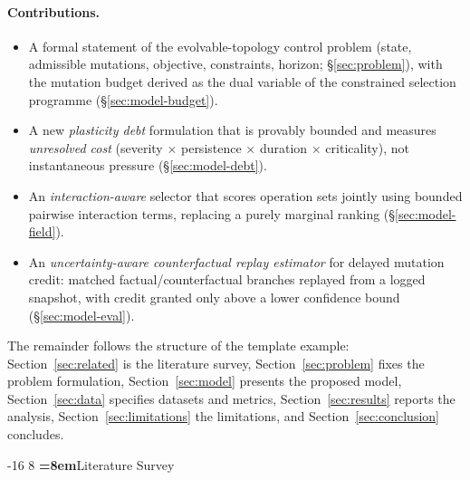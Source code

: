 \documentclass[runningheads]{llncs}
\makeatletter
\renewcommand\section{\@startsection{section}{1}{\z@}%
  {-16\p@ \@plus -4\p@ \@minus -4\p@}%
  {8\p@ \@plus 4\p@ \@minus 4\p@}%
  {\normalfont\large\bfseries\boldmath\color{vitblue}%
   \rightskip=\z@ \@plus 8em\pretolerance=10000}}
\let\plens@section\section
\renewcommand\section{\clearpage\plens@section}
\makeatother
\begin{document}
\paragraph{Contributions.}
\begin{itemize}
\item A formal statement of the evolvable-topology control problem
(state, admissible mutations, objective, constraints, horizon;
\S\ref{sec:problem}), with the mutation budget derived as the dual variable
of the constrained selection programme (\S\ref{sec:model-budget}).
\item A new \emph{plasticity debt} formulation that is provably bounded and
measures \emph{unresolved cost} (severity $\times$ persistence $\times$
duration $\times$ criticality), not instantaneous pressure
(\S\ref{sec:model-debt}).
\item An \emph{interaction-aware} selector that scores operation sets
jointly using bounded pairwise interaction terms, replacing a purely
marginal ranking (\S\ref{sec:model-field}).
\item An \emph{uncertainty-aware counterfactual replay estimator} for
delayed mutation credit: matched factual/counterfactual branches replayed
from a logged snapshot, with credit granted only above a lower confidence
bound (\S\ref{sec:model-eval}).
\end{itemize}

The remainder follows the structure of the template example: Section~\ref{sec:related}
is the literature survey, Section~\ref{sec:problem} fixes the problem
formulation, Section~\ref{sec:model} presents the proposed model,
Section~\ref{sec:data} specifies datasets and metrics,
Section~\ref{sec:results} reports the analysis,
Section~\ref{sec:limitations} the limitations, and
Section~\ref{sec:conclusion} concludes.

\section{Literature Survey}
\label{sec:related}
\end{document}
